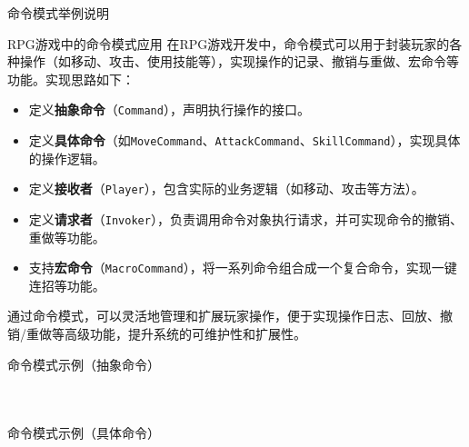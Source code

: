 \documentclass[UTF8,aspectratio=169]{beamer}
\begin{document}
\begin{frame}{命令模式举例说明}
    \begin{exampleytublock}{RPG游戏中的命令模式应用}
        在RPG游戏开发中，命令模式可以用于封装玩家的各种操作（如移动、攻击、使用技能等），实现操作的记录、撤销与重做、宏命令等功能。实现思路如下：
        \begin{itemize}
            \item 定义\textbf{抽象命令}（\texttt{Command}），声明执行操作的接口。
            \item 定义\textbf{具体命令}（如\texttt{MoveCommand}、\texttt{AttackCommand}、\texttt{SkillCommand}），实现具体的操作逻辑。
            \item 定义\textbf{接收者}（\texttt{Player}），包含实际的业务逻辑（如移动、攻击等方法）。
            \item 定义\textbf{请求者}（\texttt{Invoker}），负责调用命令对象执行请求，并可实现命令的撤销、重做等功能。
            \item 支持\textbf{宏命令}（\texttt{MacroCommand}），将一系列命令组合成一个复合命令，实现一键连招等功能。
        \end{itemize}
        通过命令模式，可以灵活地管理和扩展玩家操作，便于实现操作日志、回放、撤销/重做等高级功能，提升系统的可维护性和扩展性。
    \end{exampleytublock}
\end{frame}

\begin{frame}{命令模式示例（抽象命令）}
    \begin{columns}
        \begin{column}{0.48\textwidth}
            \inputminted[firstline=1, lastline=21]{cpp}{code/command_pattern.cpp}
        \end{column}
        \begin{column}{0.48\textwidth}
            \inputminted[firstline=23, lastline=40]{cpp}{code/command_pattern.cpp}
        \end{column}
    \end{columns}
\end{frame}

\begin{frame}{命令模式示例（具体命令）}
    \begin{columns}
        \begin{column}{0.48\textwidth}
            \inputminted[firstline=42, lastline=60]{cpp}{code/command_pattern.cpp}
        \end{column}
        \begin{column}{0.48\textwidth}
            \inputminted[firstline=61, lastline=80]{cpp}{code/command_pattern.cpp}
        \end{column}
    \end{columns}
\end{frame}
\end{document}
